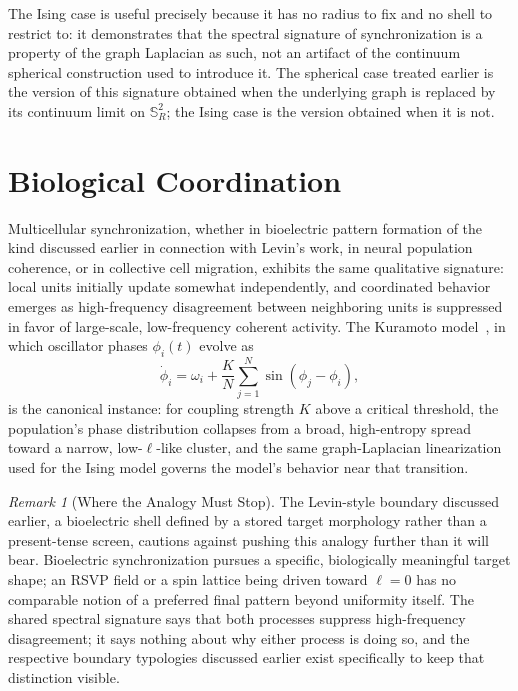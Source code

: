 \documentclass[11pt,fleqn]{book}
\numberwithin{equation}{chapter}
\theoremstyle{plain}
\theoremstyle{definition}
\theoremstyle{remark}
\newtheorem{remark}[theorem]{Remark}
\newcommand{\Sphere}{\mathbb{S}^{2}}
\begin{document}
The Ising case is useful precisely because it has no radius to fix and no shell to restrict to: it demonstrates that the spectral signature of synchronization is a property of the graph Laplacian as such, not an artifact of the continuum spherical construction used to introduce it. The spherical case treated earlier is the version of this signature obtained when the underlying graph is replaced by its continuum limit on \(\Sphere_R\); the Ising case is the version obtained when it is not.

\section{Biological Coordination}

Multicellular synchronization, whether in bioelectric pattern formation of the kind discussed earlier in connection with Levin's work, in neural population coherence, or in collective cell migration, exhibits the same qualitative signature: local units initially update somewhat independently, and coordinated behavior emerges as high-frequency disagreement between neighboring units is suppressed in favor of large-scale, low-frequency coherent activity. The Kuramoto model~\cite{kuramoto1975,strogatz2000}, in which oscillator phases \(\phi_i(t)\) evolve as
\begin{equation}
\dot\phi_i = \omega_i + \frac{K}{N}\sum_{j=1}^N \sin(\phi_j - \phi_i),
\end{equation}
is the canonical instance: for coupling strength \(K\) above a critical threshold, the population's phase distribution collapses from a broad, high-entropy spread toward a narrow, low-\(\ell\)-like cluster, and the same graph-Laplacian linearization used for the Ising model governs the model's behavior near that transition.

\begin{remark}[Where the Analogy Must Stop]
The Levin-style boundary discussed earlier, a bioelectric shell defined by a stored target morphology rather than a present-tense screen, cautions against pushing this analogy further than it will bear. Bioelectric synchronization pursues a specific, biologically meaningful target shape; an RSVP field or a spin lattice being driven toward \(\ell=0\) has no comparable notion of a preferred final pattern beyond uniformity itself. The shared spectral signature says that both processes suppress high-frequency disagreement; it says nothing about why either process is doing so, and the respective boundary typologies discussed earlier exist specifically to keep that distinction visible.
\end{remark}
\end{document}
